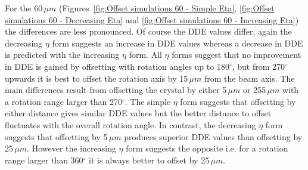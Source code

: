 For the 60$\,\mu m$ (Figures~\ref{fig:Offset simulations 60 - Simple Eta}, \ref{fig:Offset simulations 60 - Decreasing Eta} and \ref{fig:Offset simulations 60 - Increasing Eta}) the differences are less pronounced.
Of course the DDE values differ, again the decreasing $\eta$ form suggests an increase in DDE values whereas a decrease in DDE is predicted with the increasing $\eta$ form.
All $\eta$ forms suggest that no improvement in DDE is gained by offsetting with rotation angles up to 180$^{\circ}$, but from 270$^{\circ}$ upwards it is best to offset the rotation axis by 15$\,\mu m$ from the beam axis.
The main differences result from offsetting the crystal by either 5$\,\mu m$ or 255$\,\mu m$ with a rotation range larger than 270$^{\circ}$.
The simple $\eta$ form suggests that offsetting by either distance gives similar DDE values but the better distance to offset fluctuates with the overall rotation angle.
In contrast, the decreasing $\eta$ form suggests that offsetting by 5$\,\mu m$ produces superior DDE values than offsetting by 25$\,\mu m$.
However the increasing $\eta$ form suggests the opposite i.e. for a rotation range larger than 360$^{\circ}$ it is always better to offset by 25$\,\mu m$.
